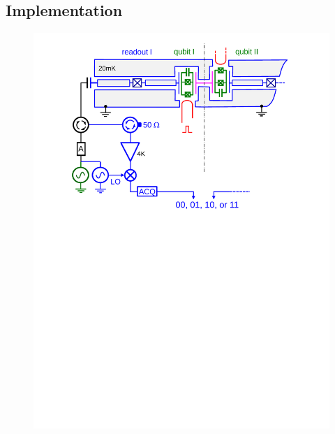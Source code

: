 \subsection{Implementation}

\begin{figure}
	\centering
		\includegraphics[width=1.\textwidth]{./material/papers/grover/figures/2_qubit_processor_schematic}
	\label{fig:Grover2}
	\caption{}
\end{figure}

